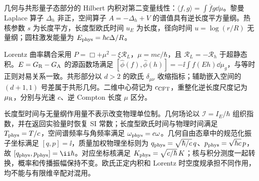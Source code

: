 几何与共形量子态部分的 Hilbert 内积对第二变量线性：$\langle f,g\rangle=\int\overline f g\dd\mu$。黎曼 Laplace 算子 $\Delta_h$ 非正，空间算子 $A=-\Delta_h+V$ 的谱值具有逆长度平方量纲。热核参数 $s$ 为长度平方，长度型欧氏时间 $u_E$ 为长度，径向时间 $u=\log(r/R)$ 无量纲；圆柱激发能量为 $E_{\rm phys}=\hbar c\Delta/R$。

Lorentz 曲率耦合采用 $P=\Box+\mu^2-\xi\mathcal R_L$，$\mu=mc/\hbar$，且 $\mathcal R_L=-\mathcal R_h$ 于超静态积。$E=G_{\rm R}-G_{\rm A}$ 的源函数场满足 $[\widehat\phi(f),\widehat\phi(h)]=-\ii\int f(Eh)\dd\mu_g$，与等时正则对易关系一致。共形部分以 $d>2$ 的欧氏 $\delta_{\mu\nu}$ 收缩指标；辅助嵌入空间的 $(d+1,1)$ 号差属于共形几何。二维中心荷记为 $c_{\rm CFT}$，重整化逆长度尺度记为 $\mu_{\rm R}$，分别与光速 $c$、逆 Compton 长度 $\mu$ 区分。

长度型时间与无量纲作用量不表示改变物理单位制。几何场论以 $\mathscr I=I_E/\hbar$ 组织指数，并在返回实验量时恢复 SI 常数；长度型欧氏时间与物理时间满足 $T_{\rm phys}=T/c$，空间谱频率与角频率满足 $\omega_{\rm phys}=c\omega$。几何自由态章中的规范化振子坐标满足 $[q,p]=\ii$，质量加权物理坐标则为 $q_{\rm phys}=\sqrt{\hbar/c}\,q$、$p_{\rm phys}=\sqrt{\hbar c}\,p$，故 $[q_{\rm phys},p_{\rm phys}]=\ii\hbar$。对应坐标核满足 $K_{\rm phys}=\sqrt{c/\hbar}\,K$；核与积分测度一起转换，概率和传播振幅保持不变。欧氏正定内积和 Lorentz 时空度规承担不同作用，均不能与有限维辛配对混用。
